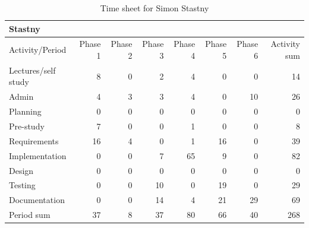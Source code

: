 \documentclass[11pt]{book}
\begin{document}
\begin{table}[H]
\centering
\begin{tabular}{| l | r | r | r | r | r | r | r |}
    \hline
    Stastny             &          &          &          &          &             &             &              \\ \hline          
    Activity/Period     & Phase 1  & Phase 2  & Phase  3 & Phase 4  & Phase 5     & Phase 6     & Activity sum \\ \hline
    Lectures/self study & 8 & 0 & 2 & 4 & 0 & 0 & 14\\ \hline          
    Admin & 4 & 3 & 3 & 4 & 0 & 10 & 26\\ \hline          
    Planning & 0 & 0 & 0 & 0 & 0 & 0 & 0\\ \hline          
    Pre-study & 7 & 0 & 0 & 1 & 0 & 0 & 8\\ \hline          
    Requirements & 16 & 4 & 0 & 1 & 16 & 0 & 39\\ \hline          
    Implementation & 0 & 0 & 7 & 65 & 9 & 0 & 82\\ \hline          
    Design & 0 & 0 & 0 & 0 & 0 & 0 & 0\\ \hline          
    Testing & 0 & 0 & 10 & 0 & 19 & 0 & 29\\ \hline          
    Documentation & 0 & 0 & 14 & 4 & 21 & 29 & 69\\ \hline          
    Period sum & 37 & 8 & 37 & 80 & 66 & 40 & 268\\ \hline          
\end{tabular}
\caption{Time sheet for Simon Stastny}
\label{tab:appendix_timesheets_simon}
\end{table}
\end{document}
